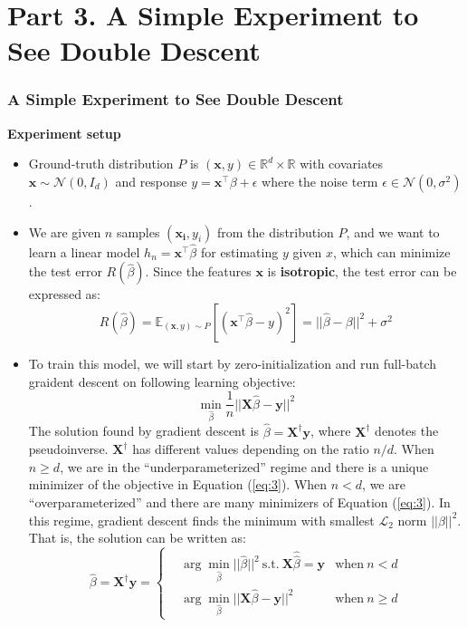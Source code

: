 \documentclass{beamer}
\begin{document}
	\section{Part 3. A Simple Experiment to See Double Descent}
	\begin{frame}[t]
		\frametitle{A Simple Experiment to See Double Descent}
		\scriptsize
		\textbf{\small Experiment setup}
		\begin{itemize}
			\justifying
			\item Ground-truth distribution $P$ is $(\mathbf{x}, y) \in \mathbb{R}^d \times \mathbb{R}$ with covariates $\mathbf{x} \sim \mathcal{N}(0, I_d)$ and response $y=\mathbf{x}^\intercal \beta + \epsilon$ where the noise term $\epsilon \in \mathcal{N}(0, \sigma^2)$.
			\item We are given $n$ samples $(\mathbf{x_i},y_i)$ from the distribution $P$, and we want to learn a linear model $h_n = \mathbf{x}^\intercal \hat{\beta}$ for estimating $y$ given $x$, which can minimize the test error $R(\hat{\beta})$. Since the features $\mathbf{x}$ is \textbf{isotropic}, the test error can be expressed as:
			\begin{equation}
				R(\hat{\beta}) = \mathbb{E}_{(\mathbf{x}, y)\sim P}[(\mathbf{x}^\intercal \hat{\beta} - y)^2] = ||\hat{\beta} - \beta||^2 + \sigma^2
				\label{eq:2}
			\end{equation}
			\item To train this model, we will start by zero-initialization and run full-batch graident descent on following learning objective:
			\begin{equation}
				 \min_{\hat{\beta}} \frac{1}{n}||\mathbf{X}\hat{\beta} - \mathbf{y}||^2
				 \label{eq:3}
			\end{equation}
			The solution found by gradient descent is $\hat{\beta} = \mathbf{X}^\dagger \mathbf{y}$, where $\mathbf{X}^\dagger$ denotes the pseudoinverse.  $\mathbf{X}^\dagger$ has different values depending on the ratio $n/d$. When $n \geq d$, we are in the “underparameterized” regime and there is a unique minimizer of the objective in Equation (\ref{eq:3}). When $n < d$, we are “overparameterized” and there are many minimizers of Equation (\ref{eq:3}). In this regime, gradient descent finds the minimum with smallest $\mathcal{L}_2$ norm $||\beta||^2$. That is, the solution can be written as:
			\begin{equation}
				\hat{\beta} = \mathbf{X}^\dagger \mathbf{y} = \left\{
				\begin{aligned}
					& \arg\min_{\hat{\beta}}||\hat{\beta}||^2 \  \text{s.t.} \ \mathbf{X}\hat{\hat{\beta}} = \mathbf{y} & \text{when} \ n < d\\
					& \arg\min_{\hat{\beta}}||\mathbf{X}\hat{\beta} - \mathbf{y}||^2 & \text{when} \ n \geq d
				\end{aligned}
				\right.
				\label{eq:4}
			\end{equation}
		\end{itemize}
	\end{frame}
\end{document}
